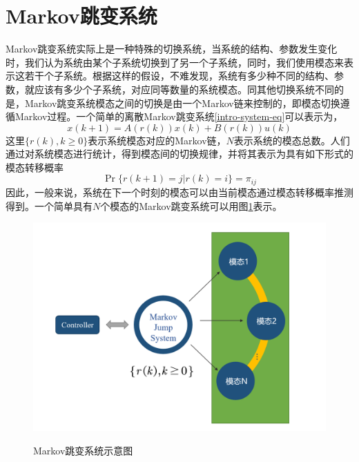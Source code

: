 \section{Markov跳变系统}
	Markov跳变系统实际上是一种特殊的切换系统，当系统的结构、参数发生变化时，我们认为系统由某个子系统切换到了另一个子系统，同时，我们使用模态来表示这若干个子系统。根据这样的假设，不难发现，系统有多少种不同的结构、参数，就应该有多少个子系统，对应同等数量的系统模态。同其他切换系统不同的是，Markov跳变系统模态之间的切换是由一个Markov链来控制的，即模态切换遵循Markov过程。一个简单的离散Markov跳变系统\eqref{intro-system-eq}可以表示为，
	\begin{equation}\label{intro-system-eq}
		x(k+1)=A(r(k))x(k)+B(r(k))u(k)
	\end{equation}
	这里$\{r(k),k\geq 0 \}$表示系统模态对应的Markov链，$N$表示系统的模态总数。人们通过对系统模态进行统计，得到模态间的切换规律，并将其表示为具有如下形式的模态转移概率
	\begin{equation}\label{introduction-tps-sys}
	\Pr\{r(k+1)=j|r(k)=i \}=\pi_{ij}
	\end{equation}
	因此，一般来说，系统在下一个时刻的模态可以由当前模态通过模态转移概率推测得到。一个简单具有$N$个模态的Markov跳变系统可以用图\ref{intro_system}表示。
	\begin{figure}[!htb] 
		\centering\includegraphics[scale=0.25]{./figures/introduction/system.png}\\ 
		\caption{Markov跳变系统示意图}
		\label{intro_system}
	\end{figure}

